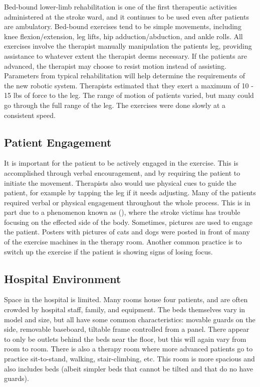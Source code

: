 \documentclass[12pt]{report}
\begin{document}
	Bed-bound lower-limb rehabilitation is one of the first therapeutic activities administered at the stroke ward, and it continues to be used even after patients are ambulatory. Bed-bound exercises tend to be simple movements, including knee flexion/extension, leg lifts, hip adduction/abduction, and ankle rolls. All exercises involve the therapist manually manipulation the patients leg, providing assistance to whatever extent the therapist deems necessary. If the patients are advanced, the therapist may choose to resist motion instead of assisting. 
	Parameters from typical rehabilitation will help determine the requirements of the new robotic system. Therapists estimated that they exert a maximum of 10 - 15 lbs of force to the leg. The range of motion of patients varied, but many could go through the full range of the leg. The exercises were done slowly at a consistent speed. 
	
	\subsection{Patient Engagement} 
	 It is important for the patient to be actively engaged in the exercise. This is accomplished through verbal encouragement, and by requiring the patient to initiate the movement. Therapists also would use physical cues to guide the patient, for example by tapping the leg if it needs adjusting. Many of the patients required verbal or physical engagement throughout the whole process. This is in part due to a phenomenon known as (), where the stroke victims has trouble focusing on the effected side of the body. Sometimes, pictures are used to engage the patient. Posters with pictures of cats and dogs were posted in front of many of the exercise machines in the therapy room. Another common practice is to switch up the exercise if the patient is showing signs of losing focus. 
	 
	 \subsection{Hospital Environment}
	Space in the hospital is limited. Many rooms house four patients, and are often crowded by hospital staff, family, and equipment. The beds themselves vary in model and size, but all have some common characteristics: movable guards on the side, removable baseboard, tiltable frame controlled from a panel. There appear to only be outlets behind the beds near the floor, but this will again vary from room to room. 
	There is also a therapy room where more advanced patients go to practice sit-to-stand, walking, stair-climbing, etc. This room is more spacious and also includes beds (albeit simpler beds that cannot be tilted and that do no have guards). 
	
\end{document}

